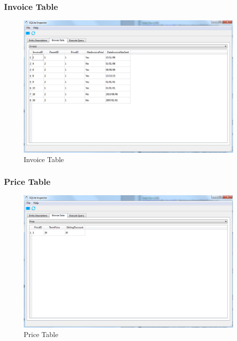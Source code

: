 \subsubsection{Invoice Table}
\begin{figure}[H]
\includegraphics[width=\textwidth]{./Maintenance/Images/DatabaseInvoice.png}
    \caption{Invoice Table} \label{fig:invoice_table}
\end{figure}

\subsubsection{Price Table}
\begin{figure}[H]
\includegraphics[width=\textwidth]{./Maintenance/Images/DatabasePrice.png}
    \caption{Price Table} \label{fig:price_table}
\end{figure}

